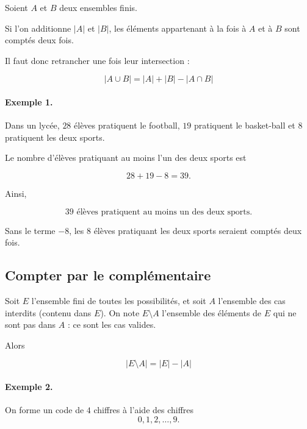 Soient \(A\) et \(B\) deux ensembles finis.

Si l'on additionne \(|A|\) et \(|B|\), les éléments appartenant à la fois à
\(A\) et à \(B\) sont comptés deux fois.

Il faut donc retrancher une fois leur intersection :

\[
\boxed{
|A\cup B|
=
|A|+|B|-|A\cap B|
}
\]

\begin{center}
\end{center}

\paragraph{Exemple 1.}
Dans un lycée, \(28\) élèves pratiquent le football, \(19\) pratiquent le
basket-ball et \(8\) pratiquent les deux sports.

Le nombre d'élèves pratiquant au moins l'un des deux sports est

\[
28+19-8=39.
\]

Ainsi,

\[
\boxed{39\text{ élèves pratiquent au moins un des deux sports}.}
\]

\medskip

Sans le terme \(-8\), les \(8\) élèves pratiquant les deux sports seraient
comptés deux fois.

\subsection{Compter par le complémentaire}

Soit \(E\) l'ensemble fini de toutes les possibilités, et soit \(A\) l'ensemble des
cas interdits (contenu dans \(E\)). On note \(E\setminus A\) l'ensemble des éléments de \(E\)
qui ne sont pas dans \(A\) : ce sont les cas valides.

Alors

\[
\boxed{
|E\setminus A|
=
|E|-|A|
}
\]

\paragraph{Exemple 2.}
On forme un code de \(4\) chiffres à l'aide des chiffres
\[
0,1,2,\dots,9.
\]

